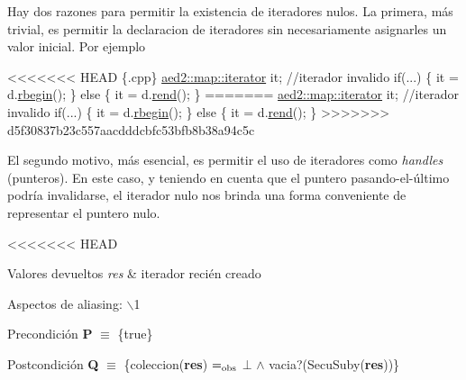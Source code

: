 Hay dos razones para permitir la existencia de iteradores nulos. La primera, más trivial, es permitir la declaracion de iteradores sin necesariamente asignarles un valor inicial. Por ejemplo 
\begin{DoxyCode}
<<<<<<< HEAD
 \{.cpp\}
 \hyperlink{classaed2_1_1map_1_1iterator}{aed2::map::iterator} it;   \textcolor{comment}{//iterador invalido}
 \textcolor{keywordflow}{if}(...) \{
   it = d.\hyperlink{classaed2_1_1map_ac412d3902112122c1bffe2d4283a4e9d_ac412d3902112122c1bffe2d4283a4e9d}{rbegin}();
 \} \textcolor{keywordflow}{else} \{
   it = d.\hyperlink{classaed2_1_1map_a277f03b4f4b6b98879e4e4921081801f_a277f03b4f4b6b98879e4e4921081801f}{rend}();
 \}
=======
\hyperlink{classaed2_1_1map_1_1iterator}{aed2::map::iterator} it;   \textcolor{comment}{//iterador invalido}
\textcolor{keywordflow}{if}(...) \{
  it = d.\hyperlink{classaed2_1_1map_ac412d3902112122c1bffe2d4283a4e9d_ac412d3902112122c1bffe2d4283a4e9d}{rbegin}();
\} \textcolor{keywordflow}{else} \{
  it = d.\hyperlink{classaed2_1_1map_a277f03b4f4b6b98879e4e4921081801f_a277f03b4f4b6b98879e4e4921081801f}{rend}();
\}
>>>>>>> d5f30837b23c557aacdddcbfc53bfb8b38a94c5c
\end{DoxyCode}
 El segundo motivo, más esencial, es permitir el uso de iteradores como {\itshape handles} (punteros). En este caso, y teniendo en cuenta que el puntero pasando-\/el-\/último podría invalidarse, el iterador nulo nos brinda una forma conveniente de representar el puntero nulo.


<<<<<<< HEAD
\begin{DoxyRetVals}{\-Valores devueltos}
{\em res} & iterador recién creado\\
\hline
\end{DoxyRetVals}
\begin{DoxyParagraph}{\-Aspectos de aliasing\-:}
$\backslash$1
\end{DoxyParagraph}
\begin{DoxyPrecond}{\-Precondición}
{\bfseries \-P} $\equiv$ \{true\} 
\end{DoxyPrecond}
\begin{DoxyPostcond}{\-Postcondición}
{\bfseries \-Q} $\equiv$ \{coleccion({\bfseries res}) $=_{\rm obs}$ $\bot$ $\land$ vacia?(\-Secu\-Suby({\bfseries res}))\}
\end{DoxyPostcond}

